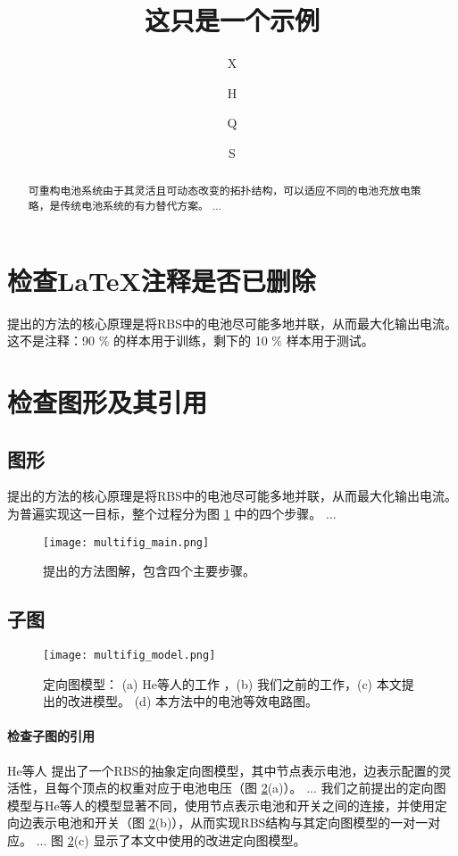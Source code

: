 \documentclass[a4paper,UTF8]{ctexart}
\title{这只是一个示例}
\author[1$\dag$]{X}
\author[1$\dag$]{H}
\author[1*]{Q}
\author[1,2]{S}
\affil[1]{中国R学院}
\affil[2]{中国A学院}
\affil[*]{通讯作者：email}
\affil[$\dag$]{这些作者对本文贡献相同。}
\begin{document}
\maketitle

\begin{abstract}
可重构电池系统由于其灵活且可动态改变的拓扑结构，可以适应不同的电池充放电策略，是传统电池系统的有力替代方案。
...
\end{abstract}

\section{检查LaTeX注释是否已删除}

提出的方法的核心原理是将RBS中的电池尽可能多地并联，从而最大化输出电流。
这不是注释：90 \% 的样本用于训练，剩下的 10 \% 样本用于测试。

\section{检查图形及其引用}

\subsection{图形}

提出的方法的核心原理是将RBS中的电池尽可能多地并联，从而最大化输出电流。为普遍实现这一目标，整个过程分为图 \ref{multifig:multifig_main} 中的四个步骤。
...


\begin{figure}[htbp]
    \centering
    \texttt{[image: multifig\_main.png]}
    \caption{
        提出的方法图解，包含四个主要步骤。
    }
    \label{multifig:multifig_main}
\end{figure}


\subsection{子图}


\begin{figure}[htbp]
    \centering
    \texttt{[image: multifig\_model.png]}
    \caption{
        定向图模型： (a) He等人的工作 \cite{heExploringAdaptiveReconfiguration2013}，(b) 我们之前的工作，(c) 本文提出的改进模型。 (d) 本方法中的电池等效电路图。
    }
    \label{multifig:multifig_model}
\end{figure}


\paragraph{检查子图的引用}
He等人 \cite{heExploringAdaptiveReconfiguration2013} 提出了一个RBS的抽象定向图模型，其中节点表示电池，边表示配置的灵活性，且每个顶点的权重对应于电池电压（图 \ref{multifig:multifig_model}(a)）。 
...
我们之前提出的定向图模型与He等人的模型显著不同，使用节点表示电池和开关之间的连接，并使用定向边表示电池和开关（图 \ref{multifig:multifig_model}(b)），从而实现RBS结构与其定向图模型的一对一对应。
...
图 \ref{multifig:multifig_model}(c) 显示了本文中使用的改进定向图模型。
\end{document}
